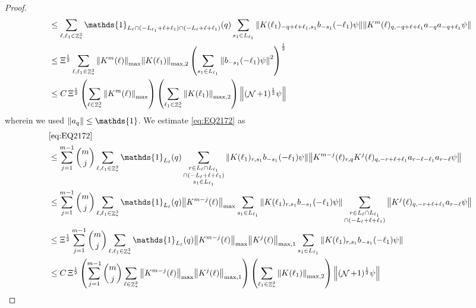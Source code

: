 \documentclass[sn-mathphys, Numbered ,a4paper]{sn-jnl}%
\DeclareMathOperator{\Z}{\mathbb{Z}}
\DeclareMathOperator{\NN}{\mathcal{N}}
\newcommand{\half}{\frac{1}{2}}
\theoremstyle{plain}
\theoremstyle{definition}
\theoremstyle{remark}
\theoremstyle{plain}
\theoremstyle{definition}
\theoremstyle{remark}
\begin{document}
\begin{proof}
\begin{align}
	&\leq \sum\limits_{\ell, \ell_1\in \Z^3_*} \mathds{1}_{L_{\ell} \cap (-L_{\ell_1}+\ell+\ell_1) \cap (-L_{\ell}+\ell+\ell_1)}(q) \sum\limits_{s_1 \in L_{\ell_1}} \norm{  K(\ell_1)_{-q+\ell+\ell_1,s_1} b_{-s_1}(-\ell_1) \psi}\norm{ K^m(\ell)_{q,-q+\ell+\ell_1}a_{-q}a_{-q+\ell_1} \psi }\nonumber\\
	&\leq \Xi^\half \sum\limits_{\ell, \ell_1\in \Z^3_*}  \norm{K^m(\ell)}_{\mathrm{max}} \norm{K(\ell_1)}_{\mathrm{max,2}} \left(\sum\limits_{s_1 \in L_{\ell_1}} \norm{ b_{-s_1}(-\ell_1) \psi}^2\right)^\half\nonumber\\
	&\leq C\, \Xi^\half \left(\sum\limits_{\ell \in \Z^3_*} \norm{K^m(\ell)}_{\mathrm{max}}\right)\left( \sum\limits_{\ell_1\in \Z^3_*} \norm{ K(\ell_1)}_{\mathrm{max,2}} \right) \norm{(\NN+1)^\half\psi}\label{eq:estEQ2171}
\end{align}
wherein we used $\norm{a_q} \leq \mathds{1}$.
We estimate \eqref{eq:EQ2172} as
\begin{align}
	&\eqref{eq:EQ2172}\nonumber\\
	&\leq\sum\limits_{j=1}^{m-1} {{m}\choose j} \sum\limits_{\ell, \ell_1\in \Z^3_*}\mathds{1}_{L_{\ell}}(q) \sum\limits_{\substack{r\in L_{\ell} \cap L_{\ell_1} \\ \cap (-L_{\ell}+\ell+\ell_1)\\s_1\in L_{\ell_1}}}  \norm{K(\ell_1)_{r,s_1} b_{-s_1}(-\ell_1) \psi}\norm{ K^{m-j}(\ell)_{r,q} K^j(\ell)_{q,-r+\ell+\ell_1} a_{r-\ell-\ell_1} a_{r-\ell} \psi }\nonumber\\
	&\leq\sum\limits_{j=1}^{m-1} {{m}\choose j} \sum\limits_{\ell, \ell_1\in \Z^3_*}\mathds{1}_{L_{\ell}}(q) \norm{K^{m-j}(\ell)}_{\mathrm{max}} \sum\limits_{s_1\in L_{\ell_1}} \norm{K(\ell_1)_{r,s_1} b_{-s_1}(-\ell_1) \psi} \sum\limits_{\substack{r\in L_{\ell} \cap L_{\ell_1} \\ \cap (-L_{\ell}+\ell+\ell_1)}}  \norm{  K^j(\ell)_{q,-r+\ell+\ell_1} a_{r-\ell} \psi }\nonumber\\
	&\leq \Xi^\half \sum\limits_{j=1}^{m-1} {{m}\choose j} \sum\limits_{\ell, \ell_1\in \Z^3_*}\mathds{1}_{L_{\ell}}(q)  \norm{K^{m-j}(\ell)}_{\mathrm{max}} \norm{K^{j}(\ell)}_{\mathrm{max,1}}  \sum\limits_{s_1\in L_{\ell_1}} \norm{K(\ell_1)_{r,s_1} b_{-s_1}(-\ell_1) \psi} \nonumber\\
	&\leq  C\,\Xi^\half \left( \sum\limits_{j=1}^{m-1} {{m}\choose j} \sum\limits_{\ell \in \Z^3_*} \norm{K^{m-j}(\ell)}_{\mathrm{max}} \norm{ K^{j}(\ell)}_{\mathrm{max},1}\right) \left( \sum\limits_{ \ell_1\in \Z^3_*}\norm{ K(\ell_1) }_{\mathrm{max,2}} \right) \norm{ (\NN+1)^\half \psi }\label{eq:estEQ2172}
\end{align}


\end{proof}
\end{document}
